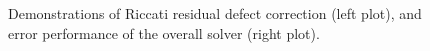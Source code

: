 \documentclass[10pt]{article}
\begin{document}
\begin{figure}[tb]  
    \flushleft
    \caption{\label{convergence-plot}
      Demonstrations of Riccati residual defect correction (left plot), and error performance of the overall solver (right plot).
}
\end{figure}
\end{document}
